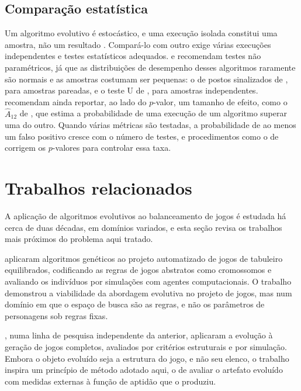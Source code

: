 \subsection{Comparação estatística}

Um algoritmo evolutivo é estocástico, e uma execução isolada constitui uma amostra, não um resultado \cite{eiben2015introduction}. Compará-lo com outro exige várias execuções independentes e testes estatísticos adequados.  e  recomendam testes não paramétricos, já que as distribuições de desempenho desses algoritmos raramente são normais e as amostras costumam ser pequenas: o de postos sinalizados de , para amostras pareadas, e o teste U de , para amostras independentes.  recomendam ainda reportar, ao lado do $p$-valor, um tamanho de efeito, como o $\hat{A}_{12}$ de , que estima a probabilidade de uma execução de um algoritmo superar uma do outro. Quando várias métricas são testadas, a probabilidade de ao menos um falso positivo cresce com o número de testes, e procedimentos como o de  corrigem os $p$-valores para controlar essa taxa.

\section{Trabalhos relacionados}
\label{sec: trabalhos_relacionados}

A aplicação de algoritmos evolutivos ao balanceamento de jogos é estudada há cerca de duas décadas, em domínios variados, e esta seção revisa os trabalhos mais próximos do problema aqui tratado.

 aplicaram algoritmos genéticos ao projeto automatizado de jogos de tabuleiro equilibrados, codificando as regras de jogos abstratos como cromossomos e avaliando os indivíduos por simulações com agentes computacionais. O trabalho demonstrou a viabilidade da abordagem evolutiva no projeto de jogos, mas num domínio em que o espaço de busca são as regras, e não os parâmetros de personagens sob regras fixas.

, numa linha de pesquisa independente da anterior, aplicaram a evolução à geração de jogos completos, avaliados por critérios estruturais e por simulação. Embora o objeto evoluído seja a estrutura do jogo, e não seu elenco, o trabalho inspira um princípio de método adotado aqui, o de avaliar o artefato evoluído com medidas externas à função de aptidão que o produziu.

